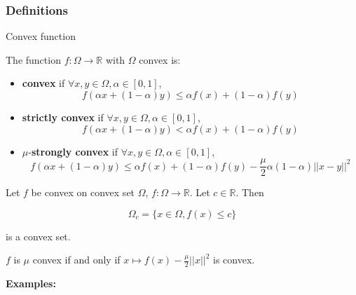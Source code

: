 \documentclass[
10pt, %
a4paper, %
oneside, %
headinclude,footinclude, %
BCOR5mm, %
]{scrartcl}
\begin{document}
\subsubsection{\large\color{Periwinkle}Definitions}

\begin{definition}{Convex function}

    The function $f:\Omega \rightarrow \mathbb{R} $ with $\Omega$ convex is:
    \begin{itemize}
	\item \textbf{{convex}} if $\forall x, y\in \Omega, \alpha\in [0,1]$,
	    \begin{equation*}
		f(\alpha x+(1-\alpha)y)\leq \alpha f(x)+(1-\alpha)f(y)
	    \end{equation*}
	\item \textbf{{strictly convex}} if $\forall x, y\in \Omega, \alpha\in [0,1]$,
	    \begin{equation*}
		f(\alpha x+(1-\alpha)y)< \alpha f(x)+(1-\alpha)f(y)
	    \end{equation*}
	\item $\mu$-\textbf{{strongly convex}} if $\forall x, y\in \Omega, \alpha\in [0,1]$,
	    \begin{equation*}
		f(\alpha x+(1-\alpha)y)\leq \alpha f(x)+(1-\alpha)f(y)- \frac{\mu}{2} \alpha(1-\alpha)||x-y||^2
	    \end{equation*}
    \end{itemize}
\end{definition}

\begin{lemma} Let $f$ be convex on convex set $ \Omega$, $f:\Omega \rightarrow \mathbb{R} $.  Let $c\in \mathbb{R} $. Then

\begin{equation*}
    \Omega_c = \{x\in \Omega, f(x)\leq c\}
\end{equation*}
 
 is a convex set.
\end{lemma}

\begin{proposition}
    $f$ is $ \mu$ convex if and only if $ x\mapsto f(x)- \frac{\mu}{2} ||x||^2$ is convex.
\end{proposition}

\textbf{{Examples:}} 
\end{document}

